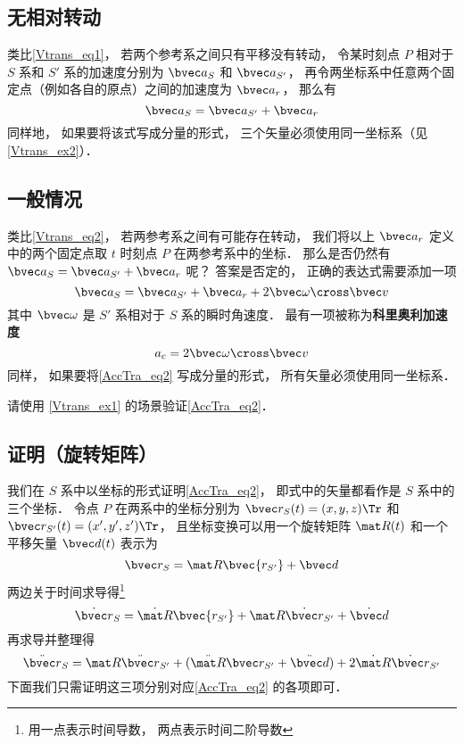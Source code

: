 

\subsection{无相对转动}
类比\autoref{Vtrans_eq1}， 若两个参考系之间只有平移没有转动， 令某时刻点 $P$ 相对于 $S$ 系和 $S'$ 系的加速度分别为 $\bvec a_S$ 和 $\bvec a_{S'}$， 再令两坐标系中任意两个固定点（例如各自的原点）之间的加速度为 $\bvec a_r$， 那么有
\begin{equation}\label{AccTra_eq1}
\bvec a_S = \bvec a_{S'} + \bvec a_r
\end{equation}
同样地， 如果要将该式写成分量的形式， 三个矢量必须使用同一坐标系（见\autoref{Vtrans_ex2}）．

\subsection{一般情况}
类比\autoref{Vtrans_eq2}， 若两参考系之间有可能存在转动， 我们将以上 $\bvec a_r$ 定义中的两个固定点取 $t$ 时刻点 $P$ 在两参考系中的坐标． 那么是否仍然有 $\bvec a_S = \bvec a_{S'} + \bvec a_r$ 呢？ 答案是否定的， 正确的表达式需要添加一项
\begin{equation}\label{AccTra_eq2}
\bvec a_S = \bvec a_{S'} + \bvec a_r + 2 \bvec \omega \cross \bvec v
\end{equation}
其中 $\bvec \omega$ 是 $S'$ 系相对于 $S$ 系的瞬时角速度． 最有一项被称为\textbf{科里奥利加速度}
\begin{equation}
a_c = 2 \bvec \omega \cross \bvec v
\end{equation}
同样， 如果要将\autoref{AccTra_eq2} 写成分量的形式， 所有矢量必须使用同一坐标系．

\begin{exercise}{}
请使用 \autoref{Vtrans_ex1} 的场景验证\autoref{AccTra_eq2}．
\end{exercise}

\subsection{证明（旋转矩阵）}
我们在 $S$ 系中以坐标的形式证明\autoref{AccTra_eq2}， 即式中的矢量都看作是 $S$ 系中的三个坐标． 令点 $P$ 在两系中的坐标分别为 $\bvec r_S(t) = (x, y, z)\Tr$ 和 $\bvec r_{S'}(t) = (x', y', z')\Tr$， 且坐标变换可以用一个旋转矩阵 $\mat R(t)$ 和一个平移矢量 $\bvec d(t)$ 表示为
\begin{equation}
\bvec r_S = \mat R \bvec{r_{S'}} + \bvec d
\end{equation}
两边关于时间求导得\footnote{用一点表示时间导数， 两点表示时间二阶导数}
\begin{equation}
\dot{\bvec r}_S = \dot{\mat R} \bvec{r_{S'}} + \mat R \dot{\bvec r}_{S'}+ \dot{\bvec d}
\end{equation}
再求导并整理得
\begin{equation}
\ddot{\bvec r}_S = \mat R \ddot{\bvec r}_{S'} + (\ddot{\mat R} \bvec r_{S'} + \ddot{\bvec d}) + 2 \dot{\mat R} \dot{\bvec r}_{S'}
\end{equation}
下面我们只需证明这三项分别对应\autoref{AccTra_eq2} 的各项即可．

